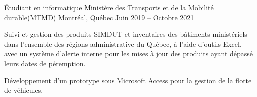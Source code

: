 \begin{cventries}

  \cventry
    {Étudiant en informatique} %
    {Ministère des Transports et de la Mobilité durable(MTMD)} %
    {Montréal, Québec} %
    {Juin 2019 -- Octobre 2021} %
    {
	  \begin{cvitems}
		\item {Suivi et gestion des produits SIMDUT et inventaires des bâtiments ministériels dans l'ensemble des régions administrative du Québec, à l’aide d’outils Excel, avec un système d’alerte interne pour les mises à jour des produits ayant dépassé leurs dates de péremption.}
		\item {Développement d’un prototype sous Microsoft Access pour la gestion de la flotte de véhicules.}
	  \end{cvitems}
    }
    
\end{cventries}
